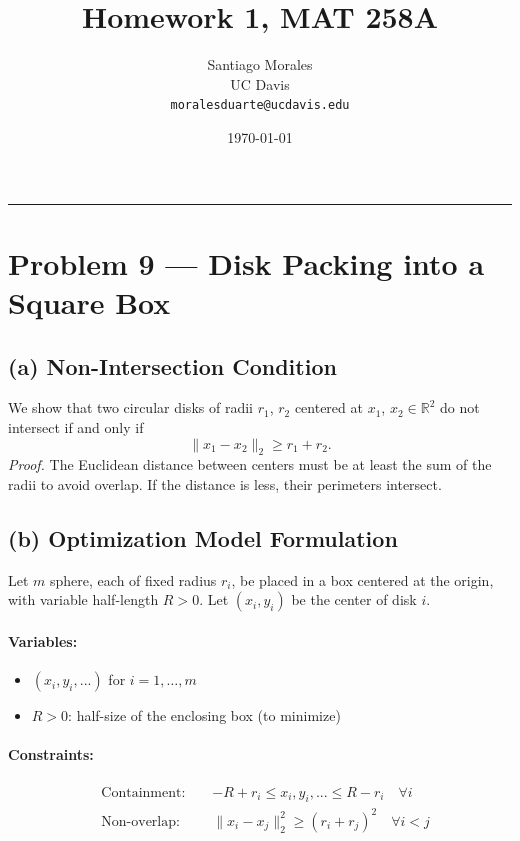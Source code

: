 \documentclass[11pt]{article}
\title{\vspace{-1cm} \textbf{Homework 1, MAT 258A}}
\author{Santiago Morales \\ UC Davis \\ \texttt{moralesduarte@ucdavis.edu}}
\date{\today}
\begin{document}
\maketitle
\vspace{-1em}
\hrule
\vspace{1em}

\section*{Problem 9 — Disk Packing into a Square Box}

\subsection*{(a) Non-Intersection Condition}

We show that two circular disks of radii $r_1$, $r_2$ centered at $x_1$, $x_2 \in \mathbb{R}^2$ do not intersect if and only if
\[
\|x_1 - x_2\|_2 \geq r_1 + r_2.
\]
\textit{Proof.} The Euclidean distance between centers must be at least the sum of the radii to avoid overlap. If the distance is less, their perimeters intersect.

\subsection*{(b) Optimization Model Formulation}

Let $m$ sphere, each of fixed radius $r_i$, be placed in a box centered at the origin, with variable half-length $R > 0$. Let $(x_i, y_i)$ be the center of disk $i$.

\paragraph{Variables:}
\begin{itemize}[noitemsep]
    \item $(x_i, y_i, ...)$ for $i = 1, \dots, m$
    \item $R > 0$: half-size of the enclosing box (to minimize)
\end{itemize}

\paragraph{Constraints:}
\begin{align*}
    & \text{Containment: } && -R + r_i \leq x_i, y_i, ... \leq R - r_i \quad \forall i \\
    & \text{Non-overlap: } && \|x_i - x_j\|_2^2 \geq (r_i + r_j)^2 \quad \forall i < j
\end{align*}
\end{document}
